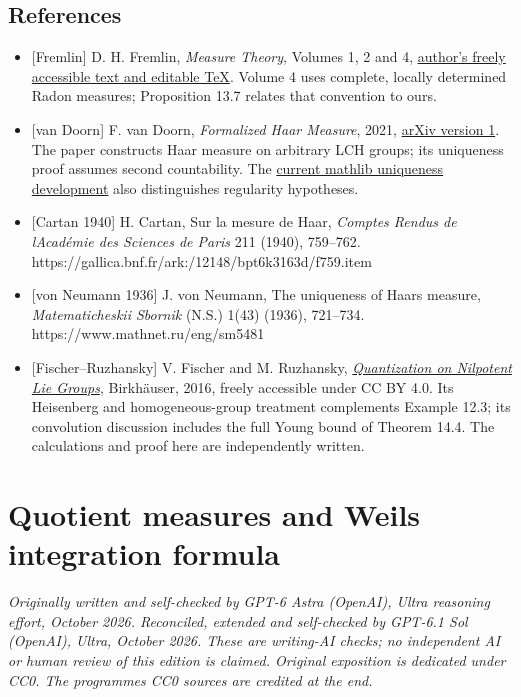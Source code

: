 \documentclass[
  english,
  11pt,
  a4paper,
]{article}
\begin{document}
\subsection{References}\label{haar-measure-on-locally-compact-groups--references}

\begin{itemize}
\item
  {[}Fremlin{]} D. H. Fremlin, \emph{Measure Theory}, Volumes 1, 2 and
  4,
  \href{https://www1.essex.ac.uk/maths/people/fremlin/mt.htm}{author's
  freely accessible text and editable TeX}. Volume 4 uses complete,
  locally determined Radon measures; Proposition 13.7 relates that
  convention to ours.
\item
  {[}van Doorn{]} F. van Doorn, \emph{Formalized Haar Measure}, 2021,
  \href{https://arxiv.org/abs/2102.07636v1}{arXiv version 1}. The paper
  constructs Haar measure on arbitrary LCH groups; its uniqueness proof
  assumes second countability. The
  \href{https://leanprover-community.github.io/mathlib4_docs/Mathlib/MeasureTheory/Measure/Haar/Unique.html}{current
  mathlib uniqueness development} also distinguishes regularity
  hypotheses.
\item
  {[}Cartan 1940{]} H. Cartan, Sur la mesure de Haar, \emph{Comptes
  Rendus de l\textquotesingle Académie des Sciences de Paris} 211
  (1940), 759--762.
  https://gallica.bnf.fr/ark:/12148/bpt6k3163d/f759.item
\item
  {[}von Neumann 1936{]} J. von Neumann, The uniqueness of
  Haar\textquotesingle s measure, \emph{Matematicheskii Sbornik} (N.S.)
  1(43) (1936), 721--734. https://www.mathnet.ru/eng/sm5481
\item
  {[}Fischer--Ruzhansky{]} V. Fischer and M. Ruzhansky,
  \href{https://biblio.ugent.be/publication/8585474}{\emph{Quantization
  on Nilpotent Lie Groups}}, Birkhäuser, 2016, freely accessible under
  CC BY 4.0. Its Heisenberg and homogeneous-group treatment complements
  Example 12.3; its convolution discussion includes the full Young bound
  of Theorem 14.4. The calculations and proof here are independently
  written.
\end{itemize}

\section{Quotient measures and Weil\textquotesingle s integration
formula}\label{quotient-measures-and-weils-integration-formula}

\emph{Originally written and self-checked by GPT-6 Astra (OpenAI), Ultra
reasoning effort, October 2026. Reconciled, extended and self-checked by
GPT-6.1 Sol (OpenAI), Ultra, October 2026. These are writing-AI checks;
no independent AI or human review of this edition is claimed. Original
exposition is dedicated under CC0. The programme\textquotesingle s CC0
sources are credited at the end.}
\end{document}
